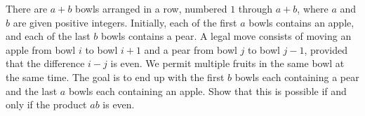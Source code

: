There are $a+b$ bowls arranged in a row, numbered $1$ through $a+b$, where $a$ and $b$ are given positive integers. Initially, each of the first $a$ bowls contains an apple, and each of the last $b$ bowls contains a pear. A legal move consists of moving an apple from bowl $i$ to bowl $i+1$ and a pear from bowl $j$ to bowl $j-1$, provided that the difference $i-j$ is even. We permit multiple fruits in the same bowl at the same time. The goal is to end up with the first $b$ bowls each containing a pear and the last $a$ bowls each containing an apple. Show that this is possible if and only if the product $ab$ is even.